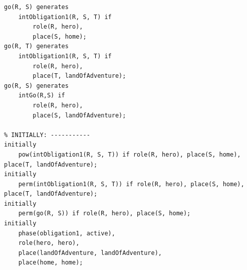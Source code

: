\documentclass[11pt]{report}
\begin{document}
\begin{lstlisting}[label={lst:obl1-instal},caption={An obligation event with no
deadline or consequence events}]
% GENERATES: Obligation 1 ----------
go(R, S) generates
    intObligation1(R, S, T) if
        role(R, hero),
        place(S, home);
go(R, T) generates
    intObligation1(R, S, T) if
        role(R, hero),
        place(T, landOfAdventure);
go(R, S) generates
    intGo(R,S) if
        role(R, hero),
        place(S, landOfAdventure);

% INITIALLY: -----------
initially
    pow(intObligation1(R, S, T)) if role(R, hero), place(S, home), place(T, landOfAdventure);
initially
    perm(intObligation1(R, S, T)) if role(R, hero), place(S, home), place(T, landOfAdventure);
initially
    perm(go(R, S)) if role(R, hero), place(S, home);
initially
    phase(obligation1, active),
    role(hero, hero),
    place(landOfAdventure, landOfAdventure),
    place(home, home);
\end{lstlisting}
\end{document}
